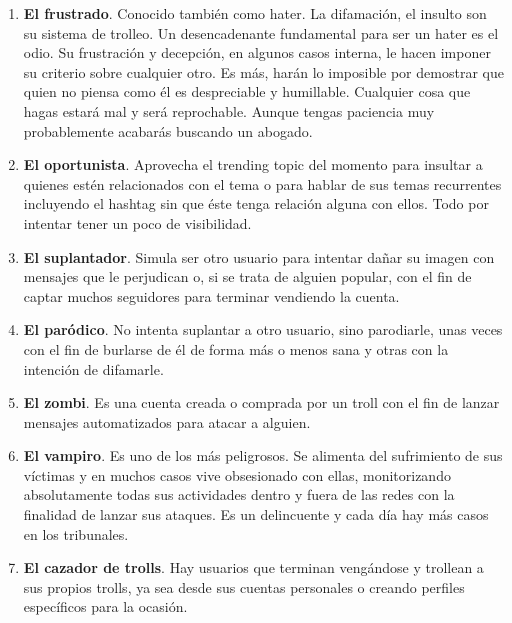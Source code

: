 \documentclass[../all.tex]{subfiles}
\begin{document}
\begin{enumerate}[resume]
        \item \textbf{El frustrado}. Conocido también como hater. La difamación, el insulto son su sistema de trolleo. Un desencadenante fundamental para ser un hater es el odio. Su frustración y decepción, en algunos casos interna, le hacen imponer su criterio sobre cualquier otro. Es más, harán lo imposible por demostrar que quien no piensa como él es despreciable y humillable. Cualquier cosa que hagas estará mal y será reprochable. Aunque tengas paciencia muy probablemente acabarás buscando un abogado.
        \item \textbf{El oportunista}. Aprovecha el trending topic del momento para insultar a quienes estén relacionados con el tema o para hablar de sus temas recurrentes incluyendo el hashtag sin que éste tenga relación alguna con ellos. Todo por intentar tener un poco de visibilidad.
        \item \textbf{El suplantador}. Simula ser otro usuario para intentar dañar su imagen con mensajes que le perjudican o, si se trata de alguien popular, con el fin de captar muchos seguidores para terminar vendiendo la cuenta.
        \item \textbf{El paródico}. No intenta suplantar a otro usuario, sino parodiarle, unas veces con el fin de burlarse de él de forma más o menos sana y otras con la intención de difamarle.
        \item \textbf{El zombi}. Es una cuenta creada o comprada por un troll con el fin de lanzar mensajes automatizados para atacar a alguien.
        \item \textbf{El vampiro}. Es uno de los más peligrosos. Se alimenta del sufrimiento de sus víctimas y en muchos casos vive obsesionado con ellas, monitorizando absolutamente todas sus actividades dentro y fuera de las redes con la finalidad de lanzar sus ataques. Es un delincuente y cada día hay más casos en los tribunales.
        \item \textbf{El cazador de trolls}. Hay usuarios que terminan vengándose y trollean a sus propios trolls, ya sea desde sus cuentas personales o creando perfiles específicos para la ocasión.
    \end{enumerate}

    
\newpage
\end{document}

